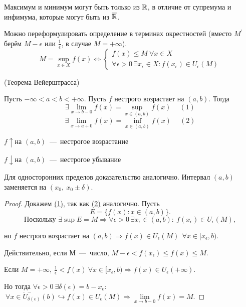 \begin{note}
    Максимум и минимум могут быть только из $\mathbb{R}$, в отличие от супремума и инфимума, которые могут быть из $\overline{\mathbb{R}}$.
\end{note}
\hypertarget{prop4.2}{}\begin{proposition} Можно переформулировать определение в терминах окрестностей (вместо $M^{'}$ берём $M - \epsilon$ или $\frac{1}{\epsilon}$, в случае $M = +\infty$).
    $$
    M = \underset{x \in X}{\sup} f(x) \Leftrightarrow 
    \begin{cases}
        f(x) \leq M \ \forall x\in X \\
        \forall \epsilon > 0 \ \exists x_\epsilon \in X: f(x_\epsilon) \in U_{\epsilon} (M)
    \end{cases}
    $$    
\end{proposition}

\begin{theorem}
    \hypertarget{thm4.5}{(Теорема Вейерштрасса)} Пусть $-\infty < a < b < +\infty$.
    Пусть $f$ нестрого возрастает на $(a, b)$. \hypertarget{prop4.1-2}{Тогда} 
$$
      \exists  \lim\limits_{x\to b -0} f (x) = \underset{x \in (a, b)}{\sup} f(x)  \ \quad (1)
$$
$$
        \exists \lim\limits_{x\to a +0} f (x) = \underset{x \in (a, b)}{\inf} f(x) \ \quad (2)
$$

\begin{note} \label{(2)}
    $f \uparrow \text{на } (a, b)$~---~нестрогое возрастание

    $f \downarrow \text{на } (a, b)$~---~нестрогое убывание
\end{note} 

\begin{note}
    Для односторонних пределов доказательство аналогично. Интервал $(a, b)$ заменяется на $(x_{0},\  x_{0} \pm \delta)$.
\end{note}
\end{theorem}

\begin{proof}
    Докажем \hyperlink{prop4.1-2}{(1)}, так как \hyperlink{prop4.1-2}{(2)} аналогично. Пусть
    $$
    E = \{f(x): x\in (a, b)\}.
    $$
    $$
    \text{Поскольку } \exists \sup E = M \Rightarrow \forall \epsilon > 0 \ \exists x_{\epsilon} \in (a, b): \ f(x_{\epsilon}) \in U_{\epsilon}(M),
    $$

    но $f$ нестрого возрастает на $(a,  b) \Rightarrow f(x)\in U_{\epsilon}(M) \ \ \forall x\in [x_{\epsilon}, b).$

    Действительно, если М~---~число, $M - \epsilon < f(x_\epsilon) \leq f(x) \leq M$.

    Если $M = +\infty$, $\frac{1}{\epsilon} < f(x) \  \forall x \in [x_{\epsilon}, b) \Rightarrow f(x) \in U_\epsilon(+\infty)$.
    
    Но тогда $\forall \epsilon > 0 \ \exists \delta(\epsilon) = b- x_{\epsilon}$: $\ \forall x \in \mathring{U}^{-}_{\delta(\epsilon)} (b) \hookrightarrow f(x)\in U_{\epsilon}(M) \Rightarrow \lim\limits_{x\to b - 0} f (x) = M.$
\end{proof}


